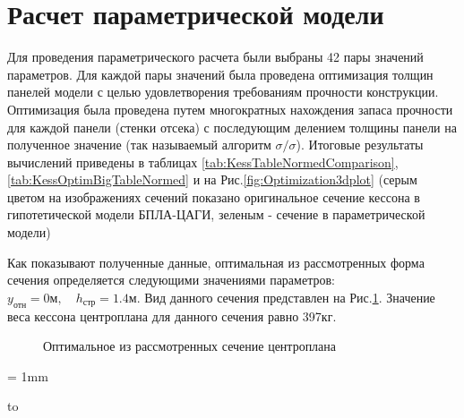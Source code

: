 \section{Расчет параметрической модели}
\label{sec:calculationOfModel}
Для проведения параметрического расчета были выбраны 42 пары значений параметров. Для каждой пары значений была проведена оптимизация толщин панелей модели с целью удовлетворения требованиям прочности конструкции. Оптимизация была проведена путем многократных нахождения запаса прочности для каждой панели (стенки отсека) с последующим делением толщины панели на полученное значение (так называемый алгоритм $\sigma/\sigma$). Итоговые результаты вычислений приведены в таблицах \ref{tab:KessTableNormedComparison}, \ref{tab:KessOptimBigTableNormed} и на Рис.\ref{fig:Optimization3dplot} (серым цветом на изображениях сечений показано оригинальное сечение кессона в гипотетической модели БПЛА-ЦАГИ, зеленым - сечение в параметрической модели)  


Как показывают полученные данные, оптимальная из рассмотренных форма сечения определяется следующими значениями параметров: $y_\text{отн} = 0\text{м},\quad h_\text{стр}=1.4\text{м}$. Вид данного сечения представлен на Рис.\ref{fig:optimalSection}. Значение веса кессона центроплана для данного сечения равно 397кг. 

\begin{figure}
\centering
\def\svgwidth{0.9\textwidth}

\caption{Оптимальное из рассмотренных сечение центроплана}
\label{fig:optimalSection}
\end{figure}



\tabulinesep = 1mm
\begin{table}[ht]
    \fontsize{11pt}{12pt}\selectfont
\captionsetup{justification=centering}
\caption{Зависимость веса кессона от параметров центроплана относительно варианта с прямым кессоном}
\begin{tabu}to 
\hline

\end{tabu}

\label{tab:KessTableNormedComparison}
\end{table}

